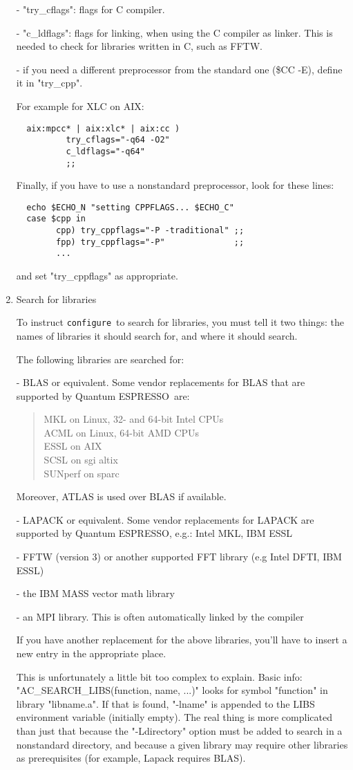 \documentclass[12pt,a4paper]{article}
\def\qe{{\sc Quantum ESPRESSO}}
\def\configure{\texttt{configure}}
\begin{document}
\begin{enumerate}
- "try\_cflags": flags for C compiler.

- "c\_ldflags": flags for linking, when using the C compiler as linker.
This is needed to check for libraries written in C, such as FFTW.

- if you need a different preprocessor from the standard one (\$CC -E),
define it in "try\_cpp".

For example for XLC on AIX:
\begin{verbatim}
  aix:mpcc* | aix:xlc* | aix:cc )
          try_cflags="-q64 -O2"
          c_ldflags="-q64"
          ;;
\end{verbatim}
Finally, if you have to use a nonstandard preprocessor, look for these
lines:
\begin{verbatim}
  echo $ECHO_N "setting CPPFLAGS... $ECHO_C"
  case $cpp in
        cpp) try_cppflags="-P -traditional" ;;
        fpp) try_cppflags="-P"              ;;
        ...
\end{verbatim}
and set "try\_cppflags" as appropriate.

\item Search for libraries

To instruct \configure\ to search for libraries, you must tell it two
things: the names of libraries it should search for, and where it
should search.

The following libraries are searched for:

- BLAS or equivalent.
Some vendor replacements for BLAS that are supported by \qe\ are:
\begin{quote}
    MKL on Linux, 32- and 64-bit Intel CPUs\\
    ACML on Linux, 64-bit AMD CPUs\\
    ESSL on AIX\\
    SCSL on sgi altix\\
    SUNperf on sparc
\end{quote}
Moreover, ATLAS is used over BLAS if available.

- LAPACK or equivalent. Some vendor replacements for LAPACK are supported
  by \qe, e.g.: Intel MKL, IBM ESSL

- FFTW (version 3) or another supported FFT library (e.g Intel DFTI,
  IBM ESSL)

- the IBM MASS vector math library

- an MPI library. This is often automatically linked by the compiler

If you have another replacement for the above libraries, you'll have
to insert a new entry in the appropriate place.

This is unfortunately a little bit too complex to explain.
Basic info: \\
"AC\_SEARCH\_LIBS(function, name, ...)" looks for symbol
"function" in library "libname.a".  If that is found, "-lname" is
appended to the LIBS environment variable (initially empty).
The real thing is more complicated than just that because the
"-Ldirectory" option must be added to search in a nonstandard
directory, and because a given library may require other libraries as
prerequisites (for example, Lapack requires BLAS).
\end{enumerate}
\end{document}
